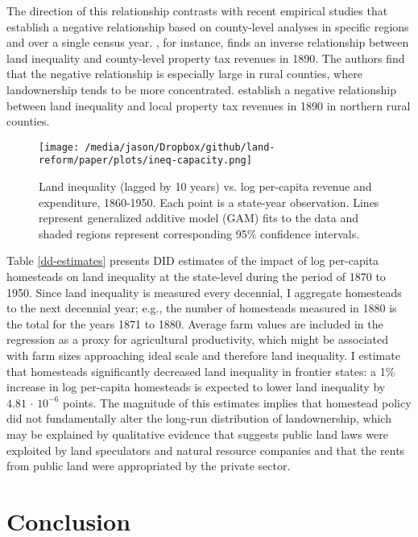 The direction of this relationship contrasts with recent empirical studies that establish a negative relationship based on county-level analyses in specific regions and over a single census year. \citet{ramcharan2010inequality}, for instance, finds an inverse relationship between land inequality and county-level property tax revenues in 1890. The authors find that the negative relationship is especially large in rural counties, where landownership tends to be more concentrated. \citet{vollrath2013inequality} establish a negative relationship between land inequality and local property tax revenues in 1890 in northern rural counties. 

\begin{figure}[htbp]
	\begin{center}
		\texttt{[image: /media/jason/Dropbox/github/land-reform/paper/plots/ineq-capacity.png]} 
	\end{center}
	\caption{Land inequality (lagged by 10 years) vs. log per-capita revenue and expenditure, 1860-1950. Each point is a state-year observation. Lines represent generalized additive model (GAM) fits to the data and shaded regions represent corresponding 95\% confidence intervals.   \label{fig:ineq-capacity}}
\end{figure} 

Table \ref{dd-estimates} presents DID estimates of the impact of log per-capita homesteads on land inequality at the state-level during the period of 1870 to 1950. Since land inequality is measured every decennial, I aggregate homesteads to the next decennial year; e.g., the number of homesteads measured in 1880 is the total for the years 1871 to 1880. Average farm values are included in the regression as a proxy for agricultural productivity, which might be associated with farm sizes approaching ideal scale and therefore land inequality. I estimate that homesteads significantly decreased land inequality in frontier states: a 1\% increase in log per-capita homesteads is expected to lower land inequality by $4.81\,\cdot\,10^{-6}$ points. The magnitude of this estimates implies that homestead policy did not fundamentally alter the long-run distribution of landownership, which may be explained by qualitative evidence that suggests public land laws were exploited by land speculators and natural resource companies and that the rents from public land were appropriated by the private sector.  

\section{Conclusion} \label{discussion-ch1} 


